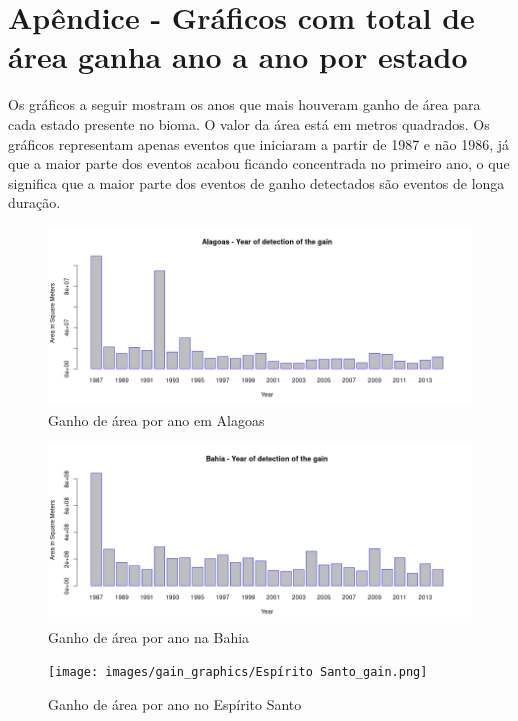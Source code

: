 \section{Apêndice - Gráficos com total de área ganha ano a ano por estado}

\hspace{13pt} Os gráficos a seguir mostram os anos que mais houveram ganho de área para cada estado presente no bioma. O valor da área está em metros quadrados. Os gráficos representam apenas eventos que iniciaram a partir de 1987 e não 1986, já que a maior parte dos eventos acabou ficando concentrada no primeiro ano, o que significa que a maior parte dos eventos de ganho detectados são eventos de longa duração. 

\begin{figure}[H]
    \centering
    \includegraphics[scale=.5]{images/gain_graphics/Alagoas_gain.png}
    \caption{Ganho de área por ano em Alagoas}
    \label{fig:gain_alagoas}
\end{figure}

\begin{figure}[H]
    \centering
    \includegraphics[scale=.5]{images/gain_graphics/Bahia_gain.png}
    \caption{Ganho de área por ano na Bahia}
    \label{fig:gain_bahia}
\end{figure}

\begin{figure}[H]
    \centering
    \texttt{[image: images/gain\_graphics/Espírito Santo\_gain.png]}
    \caption{Ganho de área por ano no Espírito Santo}
    \label{fig:gain_espirito_santo}
\end{figure}


